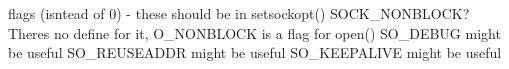 
\begin{DoxyRefList}
\item[Member \mbox{\hyperlink{classTcpSocket_a132aa72af141d611f8bad96ba585a79f}{Tcp\+Socket\+::Tcp\+Socket}} ()]\label{todo__todo000006}%
%
flags (isntead of 0) -\/ these should be in setsockopt() SOCK\+\_\+\+NONBLOCK? There\textquotesingle{}s no define for it, O\+\_\+\+NONBLOCK is a flag for open() SO\+\_\+\+DEBUG might be useful SO\+\_\+\+REUSEADDR might be useful SO\+\_\+\+KEEPALIVE might be useful 
\end{DoxyRefList}